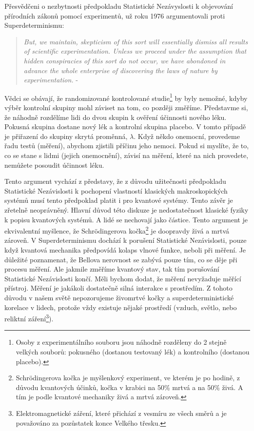 Přesvědčeni o nezbytnosti předpokladu Statistické Nezávyslosti k objevování přírodních zákonů pomocí experimentů, \citeauthor{ArgSciMeth:1} už roku 1976 argumentovali proti Superdeterminismu:
\begin{quote}
    \emph{But, we maintain, skepticism of this sort will essentially dismiss all results of scientific experimentation. Unless we proceed under the assumption that hidden conspiracies of this sort do not occur, we have abondoned in advance the whole enterprise of discovering the laws of nature by experimentation.} - \cite{ArgSciMeth:1}
\end{quote}

Vědci se obávají, že randomizované kontrolované studie\footnote[14]{Osoby z experimentálního souboru jsou náhodně rozděleny do 2 stejně velkých souborů: pokusného (dostanou testovaný lék) a kontrolního (dostanou placebo).} by byly nemožné, kdyby výběr kontrolní skupiny mohl záviset na tom, co později změříme. Představme si, že náhodně rozdělíme lidi do dvou skupin k ověření účinnosti nového léku. Pokusná skupina dostane nový lék a kontrolní skupina placebo. V tomto případě je přiřazení do skupiny skrytá proměnná, $\lambda$. Když někdo onemocní, provedeme řadu testů (měření), abychom zjistili příčinu jeho nemoci. Pokud si myslíte, že to, co se stane s lidmi (jejich onemocnění), závisí na měření, které na nich provedete, nemůžete posoudit účinnost léku.

Tento argument vychází z představy, že z důvodu užitečnosti předpokladu Statistické Nezávislosti k pochopení vlastností klasických makroskopických systémů musí tento předpoklad platit i pro kvantové systémy. Tento závěr je zřetelně neoprávněný. Hlavní důvod této diskuze je nedostatečnost klasické fyziky k popisu kvantových systémů. A lidé se nechovají jako částice. Tento argument je ekvivalentní myšlence, že Schrödingerova kočka\footnote[15]{Schrödingerova kočka je myšlenkový experiment, ve kterém je po hodině, z důvodu kvantových účinků, kočka v krabici na 50\% mrtvá a na 50\% živá. A tím je podle kvantové mechaniky živá a mrtvá zároveň.} je doopravdy živá a mrtvá zároveň. V Superdeterminismu dochází k porušení Statistické Nezávislosti, pouze když kvantová mechanika předpovídá kolaps vlnové funkce, neboli při měření. Je důležité poznamenat, že Bellova nerovnost se zabývá pouze tím, co se děje při procesu měření. Ale jakmile změříme kvantový stav, tak tím porušování Statistické Nezávislosti končí. Měli bychom dodat, že měření nevyžaduje měřící přístroj. Měření je jakákoli dostatečně silná interakce s prostředím. Z tohoto důvodu v našem světě nepozorujeme živomrtvé kočky a superdeterministické korelace v lidech, protože vždy existuje nějaké prostředí (vzduch, světlo, nebo reliktní záření\footnote[16]{Elektromagnetické záření, které přichází z vesmíru ze všech směrů a je považováno za pozůstatek konce Velkého třesku.}).